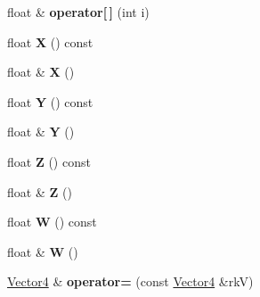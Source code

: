 \begin{DoxyCompactItemize}
\item 
float \& {\bfseries operator\mbox{[}$\,$\mbox{]}} (int i)\hypertarget{class_i_dream_sky_1_1_vector4_a2e9c6d075b3253c68e2240099ec2130e}{}\label{class_i_dream_sky_1_1_vector4_a2e9c6d075b3253c68e2240099ec2130e}

\item 
float {\bfseries X} () const \hypertarget{class_i_dream_sky_1_1_vector4_a8b00f75e7b9b3da1f079b1132adc0ed4}{}\label{class_i_dream_sky_1_1_vector4_a8b00f75e7b9b3da1f079b1132adc0ed4}

\item 
float \& {\bfseries X} ()\hypertarget{class_i_dream_sky_1_1_vector4_abd0aa71ffae038f665acb7d77ea5f96f}{}\label{class_i_dream_sky_1_1_vector4_abd0aa71ffae038f665acb7d77ea5f96f}

\item 
float {\bfseries Y} () const \hypertarget{class_i_dream_sky_1_1_vector4_a738b30e02c2342279c1d047d6638eec8}{}\label{class_i_dream_sky_1_1_vector4_a738b30e02c2342279c1d047d6638eec8}

\item 
float \& {\bfseries Y} ()\hypertarget{class_i_dream_sky_1_1_vector4_a6fd27a7b4642e30b6244c8d34ee89adf}{}\label{class_i_dream_sky_1_1_vector4_a6fd27a7b4642e30b6244c8d34ee89adf}

\item 
float {\bfseries Z} () const \hypertarget{class_i_dream_sky_1_1_vector4_a72023d96a1a3dc1d244985a8e622568e}{}\label{class_i_dream_sky_1_1_vector4_a72023d96a1a3dc1d244985a8e622568e}

\item 
float \& {\bfseries Z} ()\hypertarget{class_i_dream_sky_1_1_vector4_abac0b039d66598b528daaafe6f4a8489}{}\label{class_i_dream_sky_1_1_vector4_abac0b039d66598b528daaafe6f4a8489}

\item 
float {\bfseries W} () const \hypertarget{class_i_dream_sky_1_1_vector4_a8804ddd4123cca00df823a5112d4ac6e}{}\label{class_i_dream_sky_1_1_vector4_a8804ddd4123cca00df823a5112d4ac6e}

\item 
float \& {\bfseries W} ()\hypertarget{class_i_dream_sky_1_1_vector4_a966abe85b9f1820749d760ae24753f50}{}\label{class_i_dream_sky_1_1_vector4_a966abe85b9f1820749d760ae24753f50}

\item 
\hyperlink{class_i_dream_sky_1_1_vector4}{Vector4} \& {\bfseries operator=} (const \hyperlink{class_i_dream_sky_1_1_vector4}{Vector4} \&rkV)\hypertarget{class_i_dream_sky_1_1_vector4_a907b0e050e71493a74708c0dd434a211}{}\label{class_i_dream_sky_1_1_vector4_a907b0e050e71493a74708c0dd434a211}


\end{DoxyCompactItemize}
